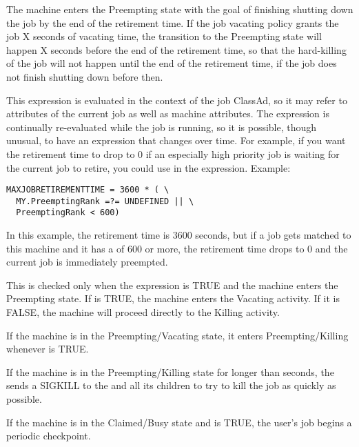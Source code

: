 \begin{description}
The machine enters the Preempting state with the goal of finishing
shutting down the job by the end of the retirement time.  If the job
vacating policy grants the job X seconds of vacating time, the
transition to the Preempting state will happen X seconds before the
end of the retirement time, so that the hard-killing of the job will not
happen until the end of the retirement time, if the job does not finish
shutting down before then.

This expression is evaluated in the context of the job ClassAd, so it
may refer to attributes of the current job as well as machine
attributes.  The expression is continually re-evaluated while the job
is running, so it is possible, though unusual, to have an expression
that changes over time.  For example, if you want the retirement time
to drop to 0 if an especially high priority job is waiting for the
current job to retire, you could use  in the
expression.  Example:

\begin{verbatim}
MAXJOBRETIREMENTTIME = 3600 * ( \
  MY.PreemptingRank =?= UNDEFINED || \
  PreemptingRank < 600)
\end{verbatim}

In this example, the retirement time is 3600 seconds, but if a job gets
matched to this machine and it has a  of 600 or more,
the retirement time drops to 0 and the current job is immediately preempted.

\item[\Macro{WANT\_VACATE}] This is checked only when the
   expression is TRUE and the machine enters the
  Preempting state.
  If \MacroNI{WANT\_VACATE} is TRUE, the machine enters the Vacating
  activity.  
  If it is FALSE, the machine will proceed directly to the Killing
  activity.  
  
\item[\Macro{KILL}] If the machine is in the Preempting/Vacating state, it
  enters Preempting/Killing whenever  is TRUE. 
  
\item[\Macro{KILLING\_TIMEOUT}] If the machine is in the
  Preempting/Killing state for longer than 
  seconds, the \Condor{startd} sends a SIGKILL to the 
  and all its children to try to kill the job as quickly as possible.
  
\item[] If the machine is in the
  Claimed/Busy state and \MacroNI{PERIODIC\_CHECKPOINT} is TRUE, the
  user's job begins a periodic checkpoint.
  

\end{description}
